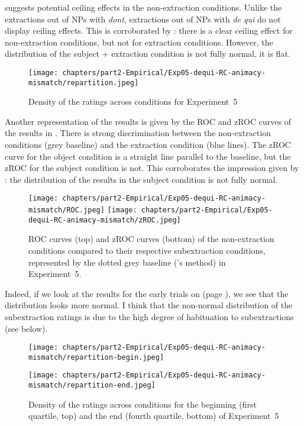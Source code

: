  suggests potential ceiling effects in the non-extraction conditions. Unlike the extractions out of NPs with \emph{dont}, extractions out of NPs with \emph{de qui} do not display ceiling effects. This is corroborated by : there is a clear ceiling effect for non-extraction conditions, but not for extraction conditions. However, the distribution of the subject + extraction condition is not fully normal, it is flat. 

\begin{figure}
    \centering
    \texttt{[image: chapters/part2-Empirical/Exp05-dequi-RC-animacy-mismatch/repartition.jpeg]}
    \caption{Density of the ratings across conditions for Experiment~5}
    \label{fig:exp05-repartition}
\end{figure}

Another representation of the results is given by the ROC and zROC curves of the results in . There is strong discrimination between the non-extraction conditions (grey baseline) and the extraction condition (blue lines). The zROC curve for the object condition is a straight line parallel to the baseline, but the zROC for the subject condition is not. This corroborates the impression given by : the distribution of the results in the subject condition is not fully normal.

\begin{figure}
    \centering
    \texttt{[image: chapters/part2-Empirical/Exp05-dequi-RC-animacy-mismatch/ROC.jpeg]}
    \texttt{[image: chapters/part2-Empirical/Exp05-dequi-RC-animacy-mismatch/zROC.jpeg]}
    \caption{ROC curves (top) and zROC curves (bottom) of the non-extraction conditions compared to their respective subextraction conditions, represented by the dotted grey baseline (\citealt{Dillon.2019}'s method) in Experiment~5.}
    \label{fig:exp05-ROC}
\end{figure}

Indeed, if we look at the results for the early trials on  (page \pageref{fig:exp05-repartition-begin-end}), we see that the distribution looks more normal. I think that the non-normal distribution of the subextraction ratings is due to the high degree of habituation to subextractions (see below). 

\begin{figure}
    \centering
    \texttt{[image: chapters/part2-Empirical/Exp05-dequi-RC-animacy-mismatch/repartition-begin.jpeg]}
    
    \texttt{[image: chapters/part2-Empirical/Exp05-dequi-RC-animacy-mismatch/repartition-end.jpeg]}
    \caption{Density of the ratings across conditions for the beginning (first quartile, top) and the end (fourth quartile, bottom) of Experiment~5}
    \label{fig:exp05-repartition-begin-end}
\end{figure}

